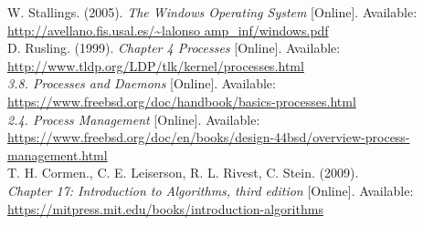 \documentclass[letterpaper,10pt,onecolumn]{IEEEtran}
\begin{document}
\newpage

\begin{thebibliography}{4}

W. Stallings. (2005). 
\textit{The Windows Operating System} 
[Online]. Available: 
\\\url{http://avellano.fis.usal.es/~lalonso amp_inf/windows.pdf}
\\

D. Rusling. (1999). 
\textit{Chapter 4 Processes} 
[Online]. Available: 
\\\url{http://www.tldp.org/LDP/tlk/kernel/processes.html}
\\

\textit{3.8. Processes and Daemons} 
[Online]. Available: 
\\\url{https://www.freebsd.org/doc/handbook/basics-processes.html}
\\

\textit{2.4. Process Management} 
[Online]. Available: 
\\\url{https://www.freebsd.org/doc/en/books/design-44bsd/overview-process-management.html}
\\

T. H. Cormen., C. E. Leiserson, R. L. Rivest, C. Stein. (2009). 
\\\textit{Chapter 17: Introduction to Algorithms, third edition} 
[Online]. Available: 
\\\url{https://mitpress.mit.edu/books/introduction-algorithms}
\\

\iffalse
\bibitem{first}
F. Author. (year). 
\textit{title} 
. [Online]. Available: 
\\\url{url}
\fi

\end{thebibliography}
\end{document}
